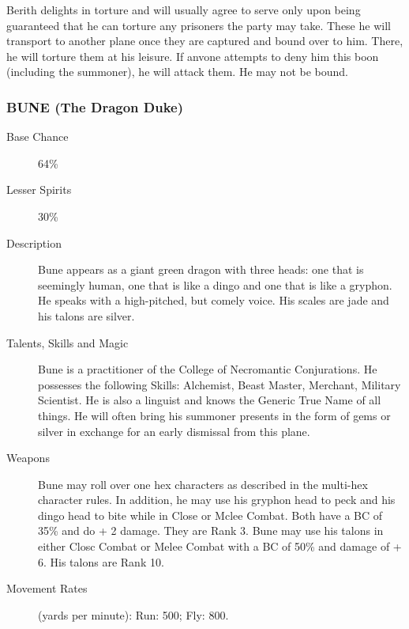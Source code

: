 \begin{multicols*}{2}
\begin{description}
\setlength\itemsep{0pt}

\item[Comments] Berith delights in torture and will usually agree to serve
only upon being guaranteed that he can torture any prisoners the party
may take.  These he will transport to another plane once they are
captured and bound over to him.  There, he will torture them at his
leisure.  If anvone attempts to deny him this boon (including the
summoner), he will attack them. He may not be bound.

\end{description}

\subsubsection{BUNE (The Dragon Duke)}

\begin{description}

\item[Base Chance] 64\%

\item[Lesser Spirits] 30\%

\item[Description] Bune appears as a giant green dragon with three heads:
one that is seemingly human, one that is like a dingo and one that is
like a gryphon.  He speaks with a high-pitched, but comely voice. His
scales are jade and his talons are silver.

\item[Talents, Skills and Magic] Bune is a practitioner of the College of Necromantic
Conjurations.  He possesses the following Skills: Alchemist, Beast
Master, Merchant, Military Scientist.  He is also a linguist and knows
the Generic True Name of all things. He will often bring his summoner
presents in the form of gems or silver in exchange for an early
dismissal from this plane.

\item[Weapons] Bune may roll over one hex characters as described in the
multi-hex character rules. In addition, he may use his gryphon head to
peck and his dingo head to bite while in Close or Mclee Combat.  Both
have a BC of 35\% and do + 2 damage.  They are Rank 3.  Bune may
use his talons in either Closc Combat or Melee Combat with a BC of
50\% and damage of + 6.  His talons are Rank 10.

\item[Movement Rates] (yards per minute): Run: 500; Fly: 800.


\end{description}
\end{multicols*}
